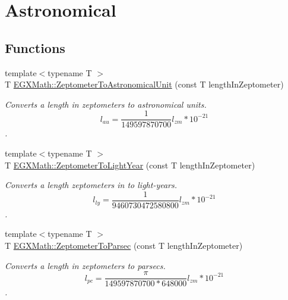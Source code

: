 \hypertarget{group___e_g_x_math-_conversions-_length_conversions-_zeptometer-_astronomical}{}\section{Astronomical}
\label{group___e_g_x_math-_conversions-_length_conversions-_zeptometer-_astronomical}
\subsection*{Functions}
\begin{DoxyCompactItemize}
\item 
{\footnotesize template$<$typename T $>$ }\\T \mbox{\hyperlink{group___e_g_x_math-_conversions-_length_conversions-_zeptometer-_astronomical_ga01bceda59fbfc5414c72ccba254b365c}{E\+G\+X\+Math\+::\+Zeptometer\+To\+Astronomical\+Unit}} (const T length\+In\+Zeptometer)
\begin{DoxyCompactList}\small\item\em Converts a length in zeptometers to astronomical units. \[ l_{au}= \frac{1}{149597870700} l_{zm} * 10^{-21} \]. \end{DoxyCompactList}\item 
{\footnotesize template$<$typename T $>$ }\\T \mbox{\hyperlink{group___e_g_x_math-_conversions-_length_conversions-_zeptometer-_astronomical_gaadccc6ef68b9d71b37be40ffbb845843}{E\+G\+X\+Math\+::\+Zeptometer\+To\+Light\+Year}} (const T length\+In\+Zeptometer)
\begin{DoxyCompactList}\small\item\em Converts a length zeptometers in to light-\/years. \[ l_{ly}= \frac{1}{9460730472580800} l_{zm} * 10^{-21} \]. \end{DoxyCompactList}\item 
{\footnotesize template$<$typename T $>$ }\\T \mbox{\hyperlink{group___e_g_x_math-_conversions-_length_conversions-_zeptometer-_astronomical_gac8c853b247f3b577cee5510bd43fcd65}{E\+G\+X\+Math\+::\+Zeptometer\+To\+Parsec}} (const T length\+In\+Zeptometer)
\begin{DoxyCompactList}\small\item\em Converts a length in zeptometers to parsecs. \[ l_{pc}=\frac{\pi}{149597870700 * 648000} l_{zm} * 10^{-21} \]. \end{DoxyCompactList}\end{DoxyCompactItemize}


